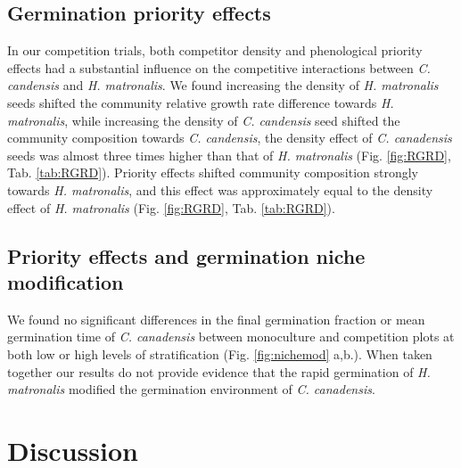 \documentclass{article}\usepackage[]{graphicx}\usepackage[]{color}
\begin{document}
\subsection*{Germination priority effects}
In our competition trials, both competitor density and phenological priority effects had a substantial influence on the competitive interactions between \textit{C. candensis} and \textit{H. matronalis}. 
We found increasing the density of \textit{H. matronalis} seeds shifted the community relative growth rate difference towards \textit{H. matronalis}, while increasing the density of \textit{C. candensis} seed shifted the community composition towards \textit{C. candensis}, the density effect of \textit{C. canadensis} seeds was almost three times higher than that of \textit{H. matronalis} (Fig. \ref{fig:RGRD}, Tab. \ref{tab:RGRD}). Priority effects shifted community composition strongly towards \textit{H. matronalis}, and this effect was approximately equal to the density effect of \textit{H. matronalis} (Fig. \ref{fig:RGRD}, Tab. \ref{tab:RGRD}).

\subsection*{Priority effects and germination niche modification}
We found no significant differences in the final germination fraction or mean germination time of \textit {C. canadensis} between monoculture and competition plots at both low or high levels of stratification (Fig. \ref{fig:nichemod} a,b.). When taken together our results do not provide evidence that the rapid germination of \textit{H. matronalis} modified the germination environment of \textit{C. canadensis}. 

\section*{Discussion}
\end{document}
